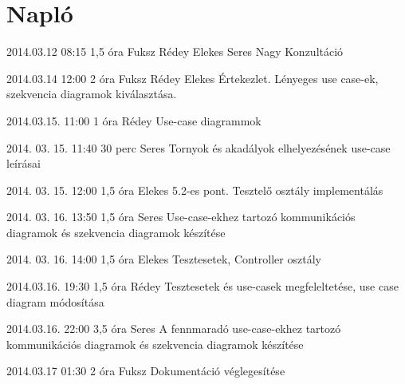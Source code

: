 %
\section{Napló}

\begin{naplo}

\bejegyzes
{2014.03.12 08:15}
{1,5 óra}
{Fuksz
Rédey
Elekes
Seres
Nagy}
{Konzultáció}

\bejegyzes
{2014.03.14 12:00}
{2 óra}
{Fuksz
Rédey
Elekes}
{Értekezlet. Lényeges use case-ek, szekvencia diagramok kiválasztása.}

\bejegyzes
{2014.03.15. 11:00}
{1 óra}
{Rédey}
{Use-case diagrammok}

\bejegyzes
{2014. 03. 15. 11:40}
{30 perc}
{Seres}
{Tornyok és akadályok elhelyezésének use-case leírásai}

\bejegyzes
{2014. 03. 15. 12:00}
{1,5 óra}
{Elekes}
{5.2-es pont. Tesztelő osztály implementálás}

\bejegyzes
{2014. 03. 16. 13:50}
{1,5 óra}
{Seres}
{Use-case-ekhez tartozó kommunikációs diagramok és szekvencia diagramok készítése}

\bejegyzes
{2014. 03. 16. 14:00}
{1,5 óra}
{Elekes}
{Tesztesetek, Controller osztály}

\bejegyzes
{2014.03.16. 19:30}
{1,5 óra}
{Rédey}
{Tesztesetek és use-casek megfeleltetése, use case diagram módosítása}

\bejegyzes
{2014.03.16. 22:00}
{3,5 óra}
{Seres}
{A fennmaradó use-case-ekhez tartozó kommunikációs diagramok és szekvencia diagramok készítése}

\bejegyzes
{2014.03.17 01:30}
{2 óra}
{Fuksz}
{Dokumentáció véglegesítése}
\end{naplo}

